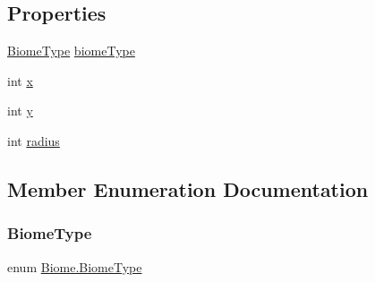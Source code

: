 \subsection*{Properties}
\begin{DoxyCompactItemize}
\item 
\mbox{\hyperlink{class_biome_a7ddcfcc6d4e88c5eb73df6827df862da}{Biome\+Type}} \mbox{\hyperlink{class_biome_a0b8fc33054a627c978fa9d81573a9e1d}{biome\+Type}}
\item 
int \mbox{\hyperlink{class_biome_ae63d1400ef2eaa0c520bec593aa2e90d}{x}}
\item 
int \mbox{\hyperlink{class_biome_a3793ddae113d9c2b545a2dc7c6b96f3a}{y}}
\item 
int \mbox{\hyperlink{class_biome_a71b951bc82d85f930f9c6135a79a2bbc}{radius}}
\end{DoxyCompactItemize}


\subsection{Member Enumeration Documentation}
\mbox{\label{class_biome_a7ddcfcc6d4e88c5eb73df6827df862da}} 
\subsubsection{\texorpdfstring{BiomeType}{BiomeType}}
{\footnotesize\ttfamily enum \mbox{\hyperlink{class_biome_a7ddcfcc6d4e88c5eb73df6827df862da}{Biome.\+Biome\+Type}}\hspace{0.3cm}{\ttfamily [strong]}}

